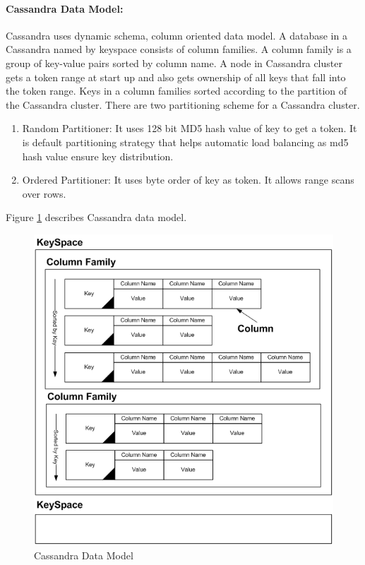 	 \paragraph{Cassandra Data Model:}
	  Cassandra uses dynamic schema, column oriented data model. A database in a Cassandra named by keyspace consists of column families.
	  A column family is a group of key-value pairs sorted by column name. A node in Cassandra cluster gets a token range at start up and also gets 
	  ownership of all keys that fall into the token range. Keys in a column families sorted according to the partition
	  of the Cassandra cluster. There are two partitioning  scheme for a Cassandra cluster.
	  \begin{enumerate}
	   \item  Random Partitioner: It uses 128 bit MD5 hash value of key to get a token. It is default partitioning strategy that helps 
		  automatic load balancing as md5 hash value ensure key distribution.
	   \item Ordered Partitioner: It uses byte order of key as token. It allows range scans over rows.
	  \end{enumerate}
	  Figure \ref{cassandra_data_model} describes Cassandra data model.\\
	      \begin{figure}[htb]
		\centering
		\includegraphics[scale=.5]{cassandra_data_model.png}
		\caption{Cassandra Data Model} 
		\label{cassandra_data_model}
	      \end{figure}
